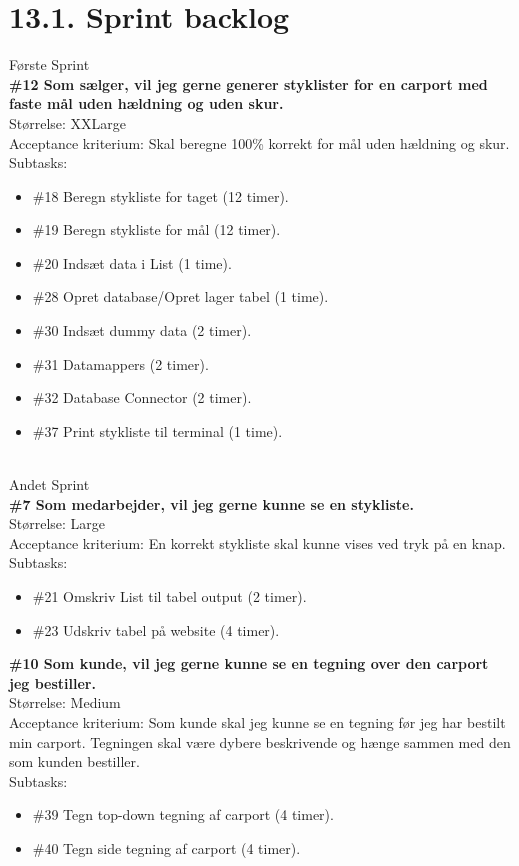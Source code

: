 \documentclass[11pt]{report}
\begin{document}
\section*{13.1. Sprint backlog}
Første Sprint\\
\textbf{\#12 Som sælger, vil jeg gerne generer styklister for en carport med faste mål uden hældning og uden skur.}\\
Størrelse: XXLarge\\
Acceptance kriterium: Skal beregne 100\% korrekt for mål uden hældning og skur.\\
Subtasks:
\begin{itemize}
\item \#18 Beregn stykliste for taget (12 timer).
\item \#19 Beregn stykliste for mål (12 timer).
\item \#20 Indsæt data i List (1 time).
\item \#28 Opret database/Opret lager tabel (1 time).
\item \#30 Indsæt dummy data (2 timer).
\item \#31 Datamappers (2 timer).
\item \#32 Database Connector (2 timer).
\item \#37 Print stykliste til terminal (1 time).
\end{itemize}
\leavevmode
\\
Andet Sprint\\
\textbf{\#7 Som medarbejder, vil jeg gerne kunne se en stykliste. }\\
Størrelse: Large \\
Acceptance kriterium: En korrekt stykliste skal kunne vises ved tryk på en knap.\\
Subtasks:
\begin{itemize}
\item \#21 Omskriv List til tabel output (2 timer).
\item \#23 Udskriv tabel på website (4 timer).
\end{itemize}
\textbf{\#10 Som kunde, vil jeg gerne kunne se en tegning over den
  carport jeg bestiller. }\\
Størrelse: Medium \\
Acceptance kriterium: Som kunde skal jeg kunne se en tegning før jeg
har bestilt min carport. Tegningen skal være dybere beskrivende og
hænge sammen med den som kunden bestiller.\\
Subtasks:
\begin{itemize}
\item \#39 Tegn top-down tegning af carport (4 timer).
\item \#40 Tegn side tegning af carport (4 timer).
\end{itemize}
\end{document}
